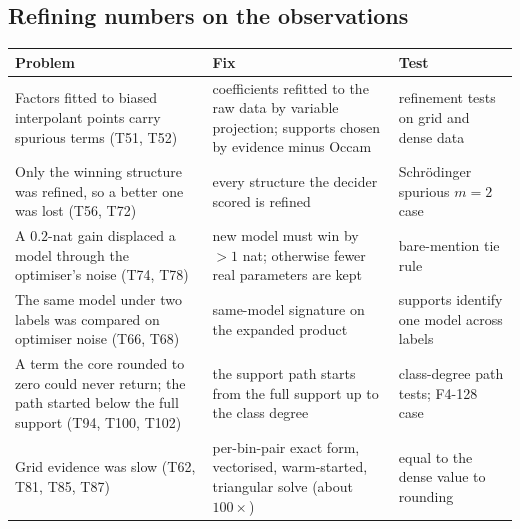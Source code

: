 \subsection{Refining numbers on the observations}
\begin{center}\small
\begin{tabular}{@{}L{4.1cm}L{4.4cm}L{4.4cm}@{}}
\toprule
Problem & Fix & Test\\\midrule
Factors fitted to biased interpolant points carry spurious terms (T51, T52) & coefficients refitted to the raw data by variable projection; supports chosen by evidence minus Occam & refinement tests on grid and dense data\\
Only the winning structure was refined, so a better one was lost (T56, T72) & every structure the decider scored is refined & Schr\"odinger spurious $m=2$ case\\
A $0.2$-nat gain displaced a model through the optimiser's noise (T74, T78) & new model must win by $>1$ nat; otherwise fewer real parameters are kept & bare-mention tie rule\\
The same model under two labels was compared on optimiser noise (T66, T68) & same-model signature on the expanded product & supports identify one model across labels\\
A term the core rounded to zero could never return; the path started below the full support (T94, T100, T102) & the support path starts from the full support up to the class degree & class-degree path tests; F4-128 case\\
Grid evidence was slow (T62, T81, T85, T87) & per-bin-pair exact form, vectorised, warm-started, triangular solve (about $100\times$) & equal to the dense value to rounding\\
\bottomrule
\end{tabular}
\end{center}

